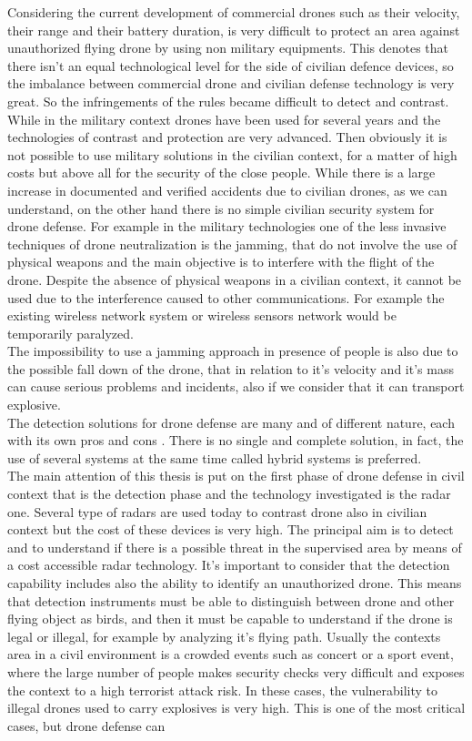 Considering the current development of commercial drones such as their velocity, their range and their battery duration, is very difficult to protect an area against unauthorized flying drone by using non military equipments. This denotes that there isn't an equal technological level for the side of civilian defence devices, so the imbalance between commercial drone and civilian defense technology is very great. So the infringements of the rules became difficult to detect and contrast. While in the military context drones have been used for several years and the technologies of contrast and protection are very advanced. Then obviously it is not possible to use military solutions in the civilian context, for a matter of high costs but above all for the security of the close people. While there is a large increase in documented and verified accidents due to civilian drones, as we can understand, on the other hand there is no simple civilian security system for drone defense. For example in the military technologies one of the less invasive techniques of drone neutralization is the jamming, that do not involve the use of physical weapons and the main objective is to interfere with the flight of the drone. Despite the absence of physical weapons in a civilian context, it cannot be used due to the interference caused to other communications. For example the existing wireless network system or wireless sensors network would be temporarily paralyzed. \\ The impossibility to use a jamming approach in presence of people is also due to the possible fall down of the drone, that in relation to it's velocity and it's mass can cause serious problems and incidents, also if we consider that it can transport explosive. \\ The detection solutions for drone defense are many and of different nature, each with its own pros and cons \cite{survey} \cite{uspace} \cite{robinradar1}. There is no single and complete solution, in fact, the use of several systems at the same time called hybrid systems is preferred. \\ The main attention of this thesis is put on the first phase of drone defense in civil context that is the detection phase and the technology investigated is the radar one. Several type of radars are used today to contrast drone also in civilian context but the cost of these devices is very high. The principal aim is to detect and to understand if there is a possible threat in the supervised area by means of a cost accessible radar technology. It's important to consider that the detection capability includes also the ability to identify an unauthorized drone. This means that detection instruments must be able to distinguish between drone and other flying object as birds, and then it must be capable to understand if the drone is legal or illegal, for example by analyzing it's flying path. Usually the contexts area in a civil environment is a crowded events such as concert or a sport event, where the large number of people makes security checks very difficult and exposes the context to a high terrorist attack risk. In these cases, the vulnerability to illegal drones used to carry explosives is very high. This is one of the most critical cases, but drone defense can 